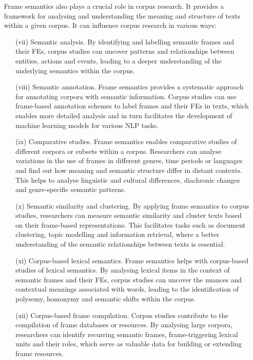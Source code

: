 \documentclass[output=paper,colorlinks,citecolor=brown]{langscibook}
\begin{document}
Frame semantics also plays a crucial role in corpus research. It provides a framework for analysing and understanding the meaning and structure of texts within a given corpus. It can influence corpus research in various ways:

\begin{itemize}
\item[(vii)] Semantic analysis. By identifying and labelling semantic frames and their FEs, corpus studies can uncover patterns and relationships between entities, actions and events, leading to a deeper understanding of the underlying semantics within the corpus.

\item[(viii)] Semantic annotation. Frame semantics provides a systematic approach for annotating corpora with semantic information. Corpus studies can use frame-based annotation schemes to label frames and their FEs in texts, which enables more detailed analysis and in turn facilitates the development of machine learning models for various NLP tasks.

\item[(ix)] Comparative studies. Frame semantics enables comparative studies of different corpora or subsets within a corpus. Researchers can analyse variations in the use of frames in different genres, time periods or languages and find out how meaning and semantic structure differ in distant contexts. This helps to analyse linguistic and cultural differences, diachronic changes and genre-specific semantic patterns.

\item[(x)] Semantic similarity and clustering. By applying frame semantics to corpus studies, researchers can measure semantic similarity and cluster texts based on their frame-based representations. This facilitates tasks such as document clustering, topic modelling and information retrieval, where a better understanding of the semantic relationships between texts is essential.

\item[(xi)] Corpus-based lexical semantics. Frame semantics helps with corpus-based studies of lexical semantics. By analysing lexical items in the context of semantic frames and their FEs, corpus studies can uncover the nuances and contextual meanings associated with words, leading to the identification of polysemy, homonymy and semantic shifts within the corpus.

\item[(xii)] Corpus-based frame compilation. Corpus studies contribute to the compilation of frame databases or resources. By analysing large corpora, researchers can identify recurring semantic frames, frame-triggering lexical units and their roles, which serve as valuable data for building or extending frame resources.
 \end{itemize}
\end{document}

